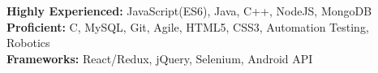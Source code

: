 



\textbf{Highly Experienced:} JavaScript(ES6), Java, C++, NodeJS, MongoDB\\
\textbf{Proficient:} C, MySQL, Git, Agile, HTML5, CSS3, Automation Testing, Robotics\\
\textbf{Frameworks:} React/Redux, jQuery, Selenium, Android API

